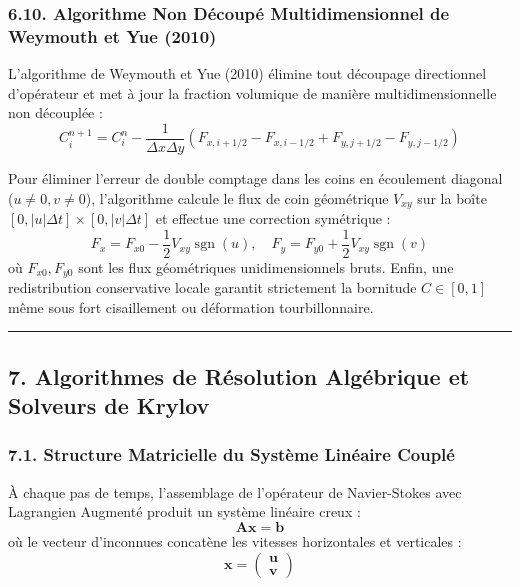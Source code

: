 \documentclass[
  french,
]{article}
\begin{document}
\subsubsection{6.10. Algorithme Non Découpé Multidimensionnel de
Weymouth et Yue
(2010)}\label{algorithme-non-duxe9coupuxe9-multidimensionnel-de-weymouth-et-yue-2010}

L'algorithme de Weymouth et Yue (2010) élimine tout découpage
directionnel d'opérateur et met à jour la fraction volumique de manière
multidimensionnelle non découplée :
\[C_i^{n+1} = C_i^n - \frac{1}{\Delta x \Delta y} \left( F_{x, i+1/2} - F_{x, i-1/2} + F_{y, j+1/2} - F_{y, j-1/2} \right)\]

Pour éliminer l'erreur de double comptage dans les coins en écoulement
diagonal (\(u \neq 0, v \neq 0\)), l'algorithme calcule le flux de coin
géométrique \(V_{xy}\) sur la boîte
\([0, |u|\Delta t] \times [0, |v|\Delta t]\) et effectue une correction
symétrique :
\[F_x = F_{x0} - \frac{1}{2} V_{xy} \operatorname{sgn}(u), \quad F_y = F_{y0} + \frac{1}{2} V_{xy} \operatorname{sgn}(v)\]
où \(F_{x0}, F_{y0}\) sont les flux géométriques unidimensionnels bruts.
Enfin, une redistribution conservative locale garantit strictement la
bornitude \(C \in [0, 1]\) même sous fort cisaillement ou déformation
tourbillonnaire.

\begin{center}\rule{0.5\linewidth}{0.5pt}\end{center}

\subsection{7. Algorithmes de Résolution Algébrique et Solveurs de
Krylov}\label{algorithmes-de-ruxe9solution-alguxe9brique-et-solveurs-de-krylov}

\subsubsection{7.1. Structure Matricielle du Système Linéaire
Couplé}\label{structure-matricielle-du-systuxe8me-linuxe9aire-coupluxe9}

À chaque pas de temps, l'assemblage de l'opérateur de Navier-Stokes avec
Lagrangien Augmenté produit un système linéaire creux :
\[\mathbf{A} \mathbf{x} = \mathbf{b}\] où le vecteur d'inconnues
concatène les vitesses horizontales et verticales :
\[\mathbf{x} = \begin{pmatrix} \mathbf{u} \\ \mathbf{v} \end{pmatrix}\]
\end{document}
